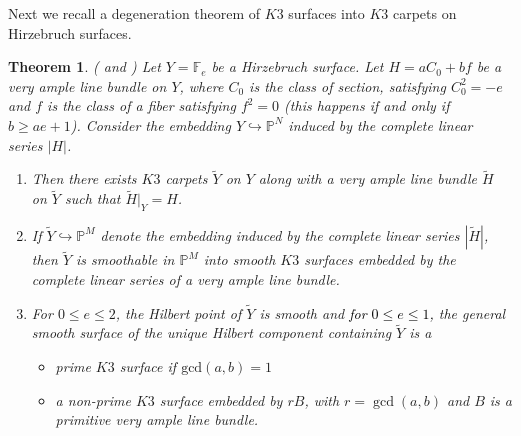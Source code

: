 \documentclass[11pt,twoside]{amsart}
\theoremstyle{plain}
\numberwithin{equation}{section}
\newtheorem{theorem}{Theorem}[section]
\theoremstyle{definition}
\begin{document}
Next we recall a degeneration theorem of $K3$ surfaces into $K3$ carpets on Hirzebruch surfaces.

\begin{theorem}\label{degeneration into $K3$ carpets}(\cite[ \textcolor{black}{Theorems $3.1, 4.3, 4.4, 5.1$}]{BMR21} and \cite[\textcolor{black}{Proposition $1.7$, Theorems $3.5, 4.1$}]{GP97})
Let $Y = \mathbb{F}_e$ be a Hirzebruch surface. Let $H = aC_0+bf$ be a very ample line bundle on $Y$, where $C_0$ is the class of section, satisfying $C_0^2 = -e$ and $f$ is the class of a fiber satisfying $f^2 = 0$ (this happens if and only if $b \geq ae+1$). Consider the embedding $Y \hookrightarrow \mathbb{P}^N$ induced by the complete linear series $|H|$.  
\begin{enumerate}
    \item Then there exists $K3$ carpets $\widetilde{Y}$ on $Y$ along with a very ample line bundle $\widetilde{H}$ on $\widetilde{Y}$ such that $\widetilde{H}|_Y = H$.

    \item If $\widetilde{Y} \hookrightarrow \mathbb{P}^M$ denote the embedding induced by the complete linear series $|\widetilde{H}|$, then $\widetilde{Y}$ is smoothable in $\mathbb{P}^M$ into smooth $K3$ surfaces embedded by the complete linear series of a very ample line bundle.

    \item For $0 \leq e \leq 2$, the Hilbert point of $\widetilde{Y}$ is smooth and \textcolor{black}{for} \textcolor{black}{$0 \leq e \leq 1$,} the general smooth surface of the unique Hilbert component containing $\widetilde{Y}$ is a 
    \begin{itemize}
        \item[(a)] prime $K3$ surface if $\textrm{gcd}(a,b) = 1$ 
        \item[(b)] a non-prime $K3$ surface embedded by $rB$, with $r = \operatorname{gcd}(a,b)$ and $B$ is a primitive very ample line bundle. 
    \end{itemize}
\end{enumerate}
\end{theorem}
\end{document}
